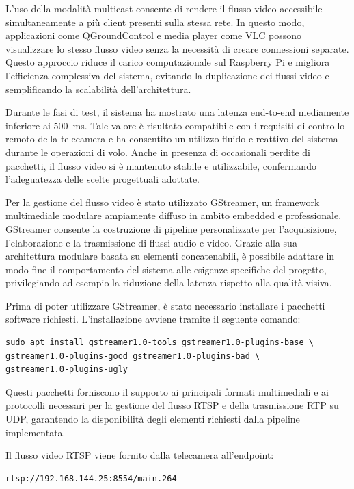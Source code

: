 L’uso della modalità multicast consente di rendere il flusso video accessibile simultaneamente a più client presenti sulla stessa rete.
In questo modo, applicazioni come QGroundControl e media player come VLC possono visualizzare lo stesso flusso video senza la necessità di creare connessioni separate.
Questo approccio riduce il carico computazionale sul Raspberry Pi e migliora l’efficienza complessiva del sistema, evitando la duplicazione dei flussi video e semplificando la scalabilità dell’architettura.

Durante le fasi di test, il sistema ha mostrato una latenza end-to-end mediamente inferiore ai 500~ms.
Tale valore è risultato compatibile con i requisiti di controllo remoto della telecamera e ha consentito un utilizzo fluido e reattivo del sistema durante le operazioni di volo.
Anche in presenza di occasionali perdite di pacchetti, il flusso video si è mantenuto stabile e utilizzabile, confermando l’adeguatezza delle scelte progettuali adottate.

Per la gestione del flusso video è stato utilizzato GStreamer\cite{gstreamer}, un framework multimediale modulare ampiamente diffuso in ambito embedded e professionale.
GStreamer consente la costruzione di pipeline personalizzate per l’acquisizione, l’elaborazione e la trasmissione di flussi audio e video.
Grazie alla sua architettura modulare basata su elementi concatenabili, è possibile adattare in modo fine il comportamento del sistema alle esigenze specifiche del progetto, privilegiando ad esempio la riduzione della latenza rispetto alla qualità visiva.

Prima di poter utilizzare GStreamer, è stato necessario installare i pacchetti software richiesti.
L’installazione avviene tramite il seguente comando:

\begin{verbatim}
sudo apt install gstreamer1.0-tools gstreamer1.0-plugins-base \
gstreamer1.0-plugins-good gstreamer1.0-plugins-bad \
gstreamer1.0-plugins-ugly
\end{verbatim}

Questi pacchetti forniscono il supporto ai principali formati multimediali e ai protocolli necessari per la gestione del flusso RTSP e della trasmissione RTP su UDP, garantendo la disponibilità degli elementi richiesti dalla pipeline implementata.

Il flusso video RTSP viene fornito dalla telecamera all’endpoint:

\begin{verbatim}
rtsp://192.168.144.25:8554/main.264
\end{verbatim}

